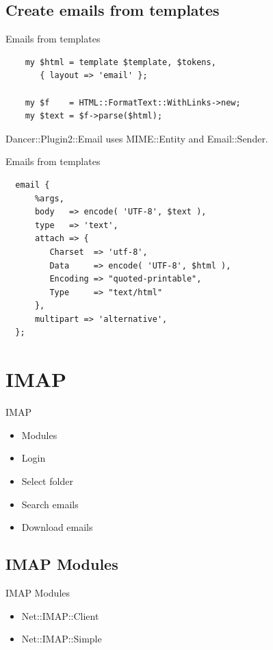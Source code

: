 \subsection{Create emails from templates}

\begin{frame}[fragile]{Emails from templates}
  \begin{verbatim}
    my $html = template $template, $tokens,
       { layout => 'email' };

    my $f    = HTML::FormatText::WithLinks->new;
    my $text = $f->parse($html);
  \end{verbatim}
\end{frame}

Dancer::Plugin2::Email uses MIME::Entity and Email::Sender.

\begin{frame}[fragile]{Emails from templates}
\begin{verbatim}
  email {
      %args,
      body   => encode( 'UTF-8', $text ),
      type   => 'text',
      attach => {
         Charset  => 'utf-8',
         Data     => encode( 'UTF-8', $html ),
         Encoding => "quoted-printable",
         Type     => "text/html"
      },
      multipart => 'alternative',
  };
\end{verbatim}
\end{frame}

\section{IMAP}

\begin{frame}{IMAP}
  \begin{itemize}
  \item Modules
  \item Login
  \item Select folder
  \item Search emails
  \item Download emails
  \end{itemize}
\end{frame}

\subsection{IMAP Modules}

\begin{frame}{IMAP Modules}
  \begin{itemize}
  \item Net::IMAP::Client
  \item Net::IMAP::Simple
  \end{itemize}
\end{frame}

